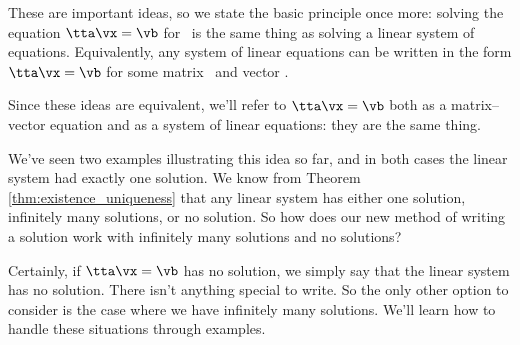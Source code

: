 These are important ideas, so we state the basic principle once more: solving the equation $\tta\vx=\vb$ for \vx\ is the same thing as solving a linear system of equations. Equivalently, any system of linear equations can be written in the form $\tta\vx=\vb$ for some matrix \tta\ and vector \vb.

Since these ideas are equivalent, we'll refer to $\tta\vx=\vb$ both as a matrix--vector equation and as a system of linear equations: they are the same thing.

We've seen two examples illustrating this idea so far, and in both cases the linear system had exactly one solution. We know from Theorem \ref{thm:existence_uniqueness} that any linear system has either one solution, infinitely many solutions, or no solution. So how does our new method of writing a solution work with infinitely many solutions and no solutions?

Certainly, if $\tta\vx=\vb$ has no solution, we simply say that the linear system has no solution. There isn't anything special to write. So the only other option to consider is the case where we have infinitely many solutions. We'll learn how to handle these situations through examples.

\medskip

